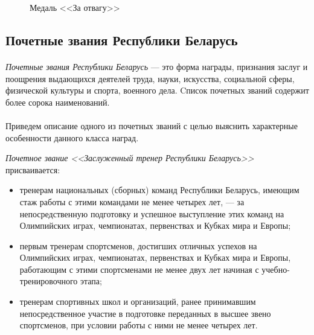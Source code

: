 \begin{figure}[h]
  \centering
  {
    \setlength{\fboxsep}{0pt}%
    \setlength{\fboxrule}{1pt}%
  }
  \caption{Медаль <<За отвагу>>}
  \label{fig:medal_otvaga}
\end{figure}

\subsection{Почетные звания Республики Беларусь}

\paragraph{}
\textit{Почетные звания Республики Беларусь} --- это форма награды,
признания заслуг и поощрения выдающихся деятелей труда, науки, искусства,
социальной сферы, физической культуры и спорта, военного дела.
Cписок почетных званий содержит более сорока наименований.

\paragraph{}
Приведем описание одного из почетных званий с целью выяснить
характерные особенности данного класса наград.

\textit{Почетное звание <<Заслуженный тренер Республики Беларусь>>}
присваивается:

\begin{itemize}
\item
  тренерам национальных (сборных) команд Республики Беларусь,
  имеющим стаж работы с этими командами не менее четырех лет,
  --- за непосредственную подготовку и успешное выступление этих команд
  на Олимпийских играх, чемпионатах, первенствах и Кубках мира и Европы;
\item
  первым тренерам спортсменов, достигших отличных успехов
  на Олимпийских играх, чемпионатах, первенствах и Кубках мира и Европы,
  работающим с этими спортсменами не менее двух лет начиная
  с учебно-тренировочного этапа;
\item
  тренерам спортивных школ и организаций, ранее принимавшим
  непосредственное участие в подготовке переданных в высшее
  звено спортсменов, при условии работы с ними не менее четырех лет.
\end{itemize}

